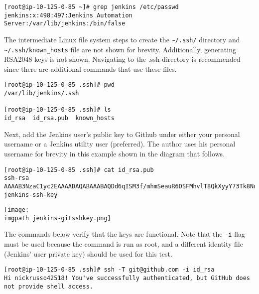 \begin{verbatim}
[root@ip-10-125-0-85 ~]# grep jenkins /etc/passwd
jenkins:x:498:497:Jenkins Automation Server:/var/lib/jenkins:/bin/false
\end{verbatim}

The intermediate Linux file system steps to create the \verb|~/.ssh/|
directory and \verb|~/.ssh/known_hosts| file are not shown for brevity.
Additionally, generating RSA2048 keys is not shown.  Navigating to the .ssh
directory is recommended since there are additional commands that use these files.

\begin{verbatim}
[root@ip-10-125-0-85 .ssh]# pwd
/var/lib/jenkins/.ssh

[root@ip-10-125-0-85 .ssh]# ls
id_rsa  id_rsa.pub  known_hosts
\end{verbatim}

Next, add the Jenkins user's public key to Github under either your personal
username or a Jenkins utility user (preferred). The author uses his personal
username for brevity in this example shown in the diagram that follows.

\begin{verbatim}
[root@ip-10-125-0-85 .ssh]# cat id_rsa.pub
ssh-rsa AAAAB3NzaC1yc2EAAAADAQABAAABAQDd6qISM3f/mhmSeauR6DSFMhvlT8QkXyyY73Tk8Nuf+SytelhP15gqTao3iA08LlpOBOnvtGXVwHEyQhMu0JTfFwRsTOGRRl3Yp9n6Y2/8AGGNTp+Q4tGpczZkh/Xs7LFyQAK3DIVBBnfF0eOiX20/dC5W72aF3IzZBIsNyc9Bcka8wmVb2gdYkj1nQg6VQI1C6yayLwyjFxEDgArGbWk0Z4GbWqgfJno5gLT844SvWmOWEJ1jNIw1ipoxSioVSSc/rsA0A3e9nWZ/HQGUbbhIOGx7k4ruQLTCPeduU+VgIIj3Iws1tFRwc+lXEn58qicJ6nFlIbAW1kJj8I/+1fEj jenkins-ssh-key
\end{verbatim}

    \begin{minipage}[t]{\linewidth}
	  \centering
      \texttt{[image: \\imgpath jenkins-gitsshkey.png]}
    \end{minipage}

The commands below verify that the keys are functional. Note that the
\verb|-i| flag must be used because the command is run as root, and a
different identity file (Jenkins' user private key) should be used for this test.

\begin{verbatim}
[root@ip-10-125-0-85 .ssh]# ssh -T git@github.com -i id_rsa
Hi nickrusso42518! You've successfully authenticated, but GitHub does not provide shell access.
\end{verbatim}

